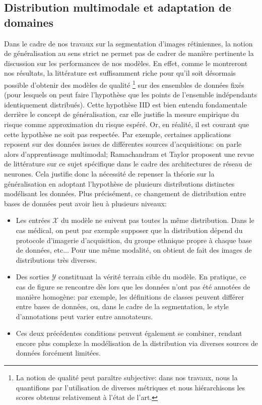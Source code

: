 \subsection{Distribution multimodale et adaptation de domaines}
\label{sec:NoisyLabelLearning}
Dans le cadre de nos travaux sur la segmentation d'images rétiniennes, la notion de généralisation au sens strict ne permet pas de cadrer de manière pertinente la discussion sur les performances de nos modèles. En effet, comme le montreront nos résultats, la littérature est suffisamment riche pour qu'il soit désormais possible d'obtenir des modèles de qualité \footnote{La notion de qualité peut paraître subjective: dans nos travaux, nous la quantifions par l'utilisation de diverses métriques et nous hiérarchisons les scores obtenus relativement à l'état de l'art.} sur des ensembles de données fixés (pour lesquels on peut faire l'hypothèse que les points de l'ensemble indépendants identiquement distribués). Cette hypothèse IID est bien entendu fondamentale derrière le concept de généralisation, car elle justifie la mesure empirique du risque comme approximation du risque espéré. Or, en réalité, il est courant que cette hypothèse ne soit pas respectée. Par exemple, certaines applications reposent sur des données issues de différentes sources d'acquisitions: on parle alors d'apprentissage multimodal; Ramachandram et Taylor \cite{ramachandramDeepMultimodalLearning2017} proposent une revue de littérature sur ce sujet spécifique dans le cadre des architectures de réseau de neurones. Cela justifie donc la nécessité de repenser la théorie sur la généralisation en adoptant l'hypothèse de plusieurs distributions distinctes modélisant les données. Plus précisément, ce changement de distribution entre bases de données peut avoir lieu à plusieurs niveaux:
\begin{itemize}
	\item Les entrées $\mathcal{X}$ du modèle ne suivent pas toutes la même distribution. Dans le cas médical, on peut par exemple supposer que la distribution dépend du protocole d'imagerie d'acquisition, du groupe ethnique propre à chaque base de données, etc... Pour une même modalité, on obtient de fait des images de distributions très diverses.
	\item Des sorties $\mathcal{Y}$ constituant la vérité terrain cible du modèle. En pratique, ce cas de figure se rencontre dès lors que les données n'ont pas été annotées de manière homogène: par exemple, les définitions de classes peuvent différer entre bases de données, ou, dans le cadre de la segmentation, le style d'annotations peut varier entre annotateurs.
	\item Ces deux précédentes conditions peuvent également se combiner, rendant encore plus complexe la modélisation de la distribution via diverses sources de données forcément limitées.
\end{itemize}
